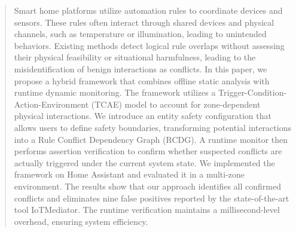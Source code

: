 \begin{abstract}


Smart home platforms utilize automation rules to coordinate devices and sensors. These rules often interact through shared devices and physical channels, such as temperature or illumination, leading to unintended behaviors. 
Existing methods detect logical rule overlaps without assessing their physical feasibility or situational harmfulness, leading to the misidentification of benign interactions as conflicts.
In this paper, we propose a hybrid framework that combines offline static analysis with runtime dynamic monitoring. The framework utilizes a Trigger-Condition-Action-Environment (TCAE) model to account for zone-dependent physical interactions. We introduce an entity safety configuration that allows users to define safety boundaries, transforming potential interactions into a Rule Conflict Dependency Graph (RCDG). A runtime monitor then performs assertion verification to confirm whether suspected conflicts are actually triggered under the current system state. We implemented the framework on Home Assistant and evaluated it in a multi-zone environment. The results show that our approach identifies all confirmed conflicts and eliminates nine false positives reported by the state-of-the-art tool IoTMediator. The runtime verification maintains a millisecond-level overhead, ensuring system efficiency.


\end{abstract}